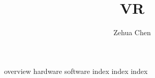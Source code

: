 \documentclass[letterpaper, 11pt]{report}
\title{VR}
\author{Zehua Chen}
\begin{document}
  \maketitle
  \tableofcontents

  {overview}
  {hardware}
  {software}
  {index}
  {index}
  {index}
\end{document}
